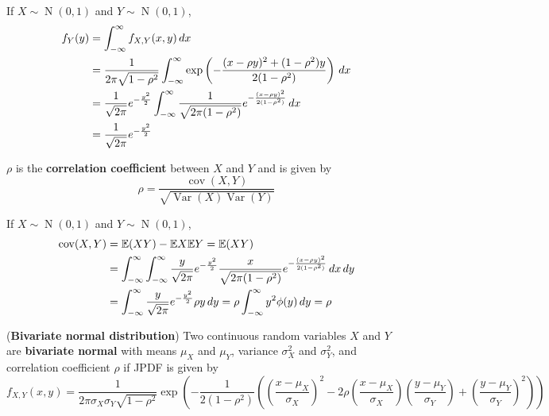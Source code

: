 \documentclass{huhtakm-template-book}
\newcommand{\expect}{\mathbb{E}}
\DeclareMathOperator{\N}{N}
\DeclareMathOperator{\Var}{Var}
\DeclareMathOperator{\cov}{cov}
\begin{document}
    \begin{rem}
        If $X\sim\N(0,1)$ and $Y\sim\N(0,1)$,
        \begin{align*}
            f_{Y}(y)&=\int_{-\infty}^{\infty} f_{X,Y}(x,y)\,dx\\
            &=\frac{1}{2\pi\sqrt{1-\rho^{2}}}\int_{-\infty}^{\infty}\exp\left(-\frac{(x-\rho y)^{2}+(1-\rho^{2})y}{2(1-\rho^{2})}\right)\,dx\\
            &=\frac{1}{\sqrt{2\pi}}e^{-\frac{y^{2}}{2}}\int_{-\infty}^{\infty}\frac{1}{\sqrt{2\pi(1-\rho^{2})}}e^{-\frac{(x-\rho y)^{2}}{2(1-\rho^{2})}}\,dx\\
            &=\frac{1}{\sqrt{2\pi}}e^{-\frac{y^{2}}{2}}
        \end{align*}
    \end{rem}
    \begin{rem}
        $\rho$ is the \textbf{correlation coefficient} between $X$ and $Y$ and is given by
        \begin{equation*}
            \rho=\frac{\cov(X,Y)}{\sqrt{\Var(X)\Var(Y)}}
        \end{equation*}
    \end{rem}
    \begin{rem}
        If $X\sim\N(0,1)$ and $Y\sim\N(0,1)$,
        \begin{align*}
            \cov(X,Y)&=\expect(XY)-\expect X\expect Y=\expect(XY)\\
            &=\intinfty\intinfty\frac{y}{\sqrt{2\pi}}e^{-\frac{y^{2}}{2}}\frac{x}{\sqrt{2\pi(1-\rho^{2})}}e^{-\frac{(x-\rho y)^{2}}{2(1-\rho^{2})}}\,dx\,dy\\
            &=\intinfty\frac{y}{\sqrt{2\pi}}e^{-\frac{y^{2}}{2}}\rho y\,dy=\rho\intinfty y^{2}\phi(y)\,dy=\rho
        \end{align*}
    \end{rem}
    \begin{eg}(\textbf{Bivariate normal distribution})
        Two continuous random variables $X$ and $Y$ are \textbf{bivariate normal} with means $\mu_{X}$ and $\mu_{Y}$, variance $\sigma_{X}^{2}$ and $\sigma_{Y}^{2}$, and correlation coefficient $\rho$ if JPDF is given by
        \begin{equation*}
            f_{X,Y}(x,y)=\frac{1}{2\pi\sigma_{X}\sigma_{Y}\sqrt{1-\rho^{2}}}\exp\left(-\frac{1}{2(1-\rho^{2})}\left(\left(\frac{x-\mu_{X}}{\sigma_{X}}\right)^{2}-2\rho\left(\frac{x-\mu_{X}}{\sigma_{X}}\right)\left(\frac{y-\mu_{Y}}{\sigma_{Y}}\right)+\left(\frac{y-\mu_{Y}}{\sigma_{Y}}\right)^{2}\right)\right)
        \end{equation*}
    \end{eg}
\end{document}
